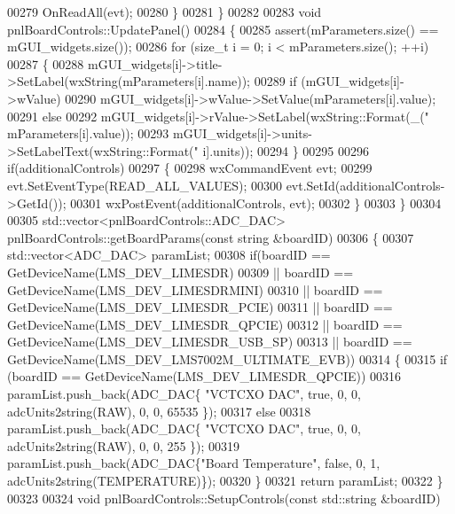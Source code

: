 \begin{DoxyCode}
{00279         OnReadAll(evt);
00280     \}
00281 \}
00282 
00283 \textcolor{keywordtype}{void} pnlBoardControls::UpdatePanel()
00284 \{
00285     assert(mParameters.size() == mGUI_widgets.size());
00286     \textcolor{keywordflow}{for} (\textcolor{keywordtype}{size\_t} i = 0; i < mParameters.size(); ++i)
00287     \{
00288         mGUI_widgets[i]->title->SetLabel(wxString(mParameters[i].name));
00289         \textcolor{keywordflow}{if} (mGUI_widgets[i]->wValue)
00290             mGUI_widgets[i]->wValue->SetValue(mParameters[i].value);
00291         \textcolor{keywordflow}{else}
00292             mGUI_widgets[i]->rValue->SetLabel(wxString::Format(\_(\textcolor{stringliteral}{"%
      mParameters[i].value));
00293         mGUI_widgets[i]->units->SetLabelText(wxString::Format(\textcolor{stringliteral}{"%
      i].units));
00294     \}
00295 
00296     \textcolor{keywordflow}{if}(additionalControls)
00297     \{
00298         wxCommandEvent evt;
00299         evt.SetEventType(READ\_ALL\_VALUES);
00300         evt.SetId(additionalControls->GetId());
00301         wxPostEvent(additionalControls, evt);
00302     \}
00303 \}
00304 
00305 std::vector<pnlBoardControls::ADC\_DAC> pnlBoardControls::getBoardParams(\textcolor{keyword}{const} \textcolor{keywordtype}{string} &boardID)
00306 \{
00307     std::vector<ADC\_DAC> paramList;
00308     \textcolor{keywordflow}{if}(boardID == GetDeviceName(LMS_DEV_LIMESDR)
00309         || boardID == GetDeviceName(LMS_DEV_LIMESDRMINI)
00310         || boardID == GetDeviceName(LMS_DEV_LIMESDR_PCIE)
00311         || boardID == GetDeviceName(LMS_DEV_LIMESDR_QPCIE)
00312         || boardID == GetDeviceName(LMS_DEV_LIMESDR_USB_SP)
00313         || boardID == GetDeviceName(LMS_DEV_LMS7002M_ULTIMATE_EVB))
00314     \{
00315         \textcolor{keywordflow}{if} (boardID == GetDeviceName(LMS_DEV_LIMESDR_QPCIE))
00316             paramList.push\_back(ADC_DAC\{ \textcolor{stringliteral}{"VCTCXO DAC"}, \textcolor{keyword}{true}, 0, 0, 
      adcUnits2string(RAW), 0, 0, 65535 \});
00317         \textcolor{keywordflow}{else}
00318             paramList.push\_back(ADC_DAC\{ \textcolor{stringliteral}{"VCTCXO DAC"}, \textcolor{keyword}{true}, 0, 0, 
      adcUnits2string(RAW), 0, 0, 255 \});
00319         paramList.push\_back(ADC_DAC\{\textcolor{stringliteral}{"Board Temperature"}, \textcolor{keyword}{false}, 0, 1, 
      adcUnits2string(TEMPERATURE)\});
00320     \}
00321     \textcolor{keywordflow}{return} paramList;
00322 \}
00323 
00324 \textcolor{keywordtype}{void} pnlBoardControls::SetupControls(\textcolor{keyword}{const} std::string &boardID)
}}}
\end{DoxyCode}
